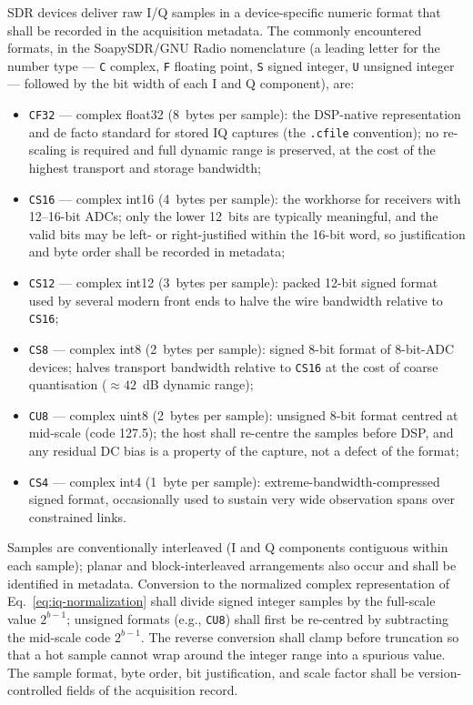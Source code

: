 \documentclass[11pt]{article}
\begin{document}
SDR devices deliver raw I/Q samples in a device-specific numeric format that shall be recorded in the acquisition metadata. The commonly encountered formats, in the SoapySDR/GNU Radio nomenclature (a leading letter for the number type --- \texttt{C} complex, \texttt{F} floating point, \texttt{S} signed integer, \texttt{U} unsigned integer --- followed by the bit width of each I and Q component), are:

\begin{itemize}
    \item \texttt{CF32} --- complex float32 (8~bytes per sample): the DSP-native representation and de facto standard for stored IQ captures (the \texttt{.cfile} convention); no re-scaling is required and full dynamic range is preserved, at the cost of the highest transport and storage bandwidth;
    \item \texttt{CS16} --- complex int16 (4~bytes per sample): the workhorse for receivers with 12--16-bit ADCs; only the lower 12~bits are typically meaningful, and the valid bits may be left- or right-justified within the 16-bit word, so justification and byte order shall be recorded in metadata;
    \item \texttt{CS12} --- complex int12 (3~bytes per sample): packed 12-bit signed format used by several modern front ends to halve the wire bandwidth relative to \texttt{CS16};
    \item \texttt{CS8} --- complex int8 (2~bytes per sample): signed 8-bit format of 8-bit-ADC devices; halves transport bandwidth relative to \texttt{CS16} at the cost of coarse quantisation ($\approx 42$~dB dynamic range);
    \item \texttt{CU8} --- complex uint8 (2~bytes per sample): unsigned 8-bit format centred at mid-scale (code 127.5); the host shall re-centre the samples before DSP, and any residual DC bias is a property of the capture, not a defect of the format;
    \item \texttt{CS4} --- complex int4 (1~byte per sample): extreme-bandwidth-compressed signed format, occasionally used to sustain very wide observation spans over constrained links.
\end{itemize}

Samples are conventionally interleaved (I and Q components contiguous within each sample); planar and block-interleaved arrangements also occur and shall be identified in metadata. Conversion to the normalized complex representation of Eq.~\eqref{eq:iq-normalization} shall divide signed integer samples by the full-scale value $2^{b-1}$; unsigned formats (e.g., \texttt{CU8}) shall first be re-centred by subtracting the mid-scale code $2^{b-1}$. The reverse conversion shall clamp before truncation so that a hot sample cannot wrap around the integer range into a spurious value. The sample format, byte order, bit justification, and scale factor shall be version-controlled fields of the acquisition record.
\end{document}
